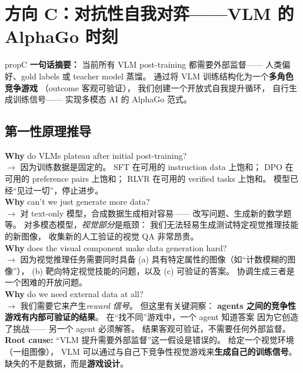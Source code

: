 \documentclass[12pt,a4paper]{article}
\begin{document}
\newpage
\section{方向 C：对抗性自我对弈——VLM 的 AlphaGo 时刻}
\label{sec:propC}

\begin{proposalbox}{propC}
\textbf{一句话摘要：}
当前所有 VLM post-training 都需要外部监督——
人类偏好、gold labels 或 teacher model 蒸馏。
通过将 VLM 训练结构化为一个\textbf{多角色竞争游戏}
（outcome 客观可验证），
我们创建一个开放式自我提升循环，
自行生成训练信号——
实现多模态 AI 的 AlphaGo 范式。
\end{proposalbox}

\subsection{第一性原理推导}

\begin{whybox}
\textbf{Why} do VLMs plateau after initial post-training?\\
$\rightarrow$ 因为训练数据是固定的。
SFT 在可用的 instruction data 上饱和；
DPO 在可用的 preference pairs 上饱和；
RLVR 在可用的 verified tasks 上饱和。
模型已经``见过一切''，停止进步。\\[3pt]
\textbf{Why} can't we just generate more data?\\
$\rightarrow$ 对 text-only 模型，合成数据生成相对容易——
改写问题、生成新的数学题等。
对多模态模型，\textit{视觉部分}是瓶颈：
我们无法轻易生成测试特定视觉推理技能的新图像，
收集新的人工验证的视觉 QA 非常昂贵。\\[3pt]
\textbf{Why} does the visual component make data generation hard?\\
$\rightarrow$ 因为视觉推理任务需要同时具备
(a) 具有特定属性的图像（如``计数模糊的图像''），
(b) 靶向特定视觉技能的问题，以及
(c) 可验证的答案。
协调生成三者是一个困难的开放问题。\\[3pt]
\textbf{Why} do we need external data at all?\\
$\rightarrow$ 我们需要它来产生\textit{reward 信号}。
但这里有关键洞察：
\textbf{agents 之间的竞争性游戏有内部可验证的结果}。
在``找不同''游戏中，一个 agent 知道答案
因为它创造了挑战——
另一个 agent 必须解答。
结果客观可验证，不需要任何外部监督。\\[3pt]
\textbf{Root cause:}
``VLM 提升需要外部监督''这一假设是错误的。
给定一个视觉环境（一组图像），
VLM 可以通过与自己下竞争性视觉游戏来\textbf{生成自己的训练信号}。
缺失的不是数据，而是\textbf{游戏设计}。
\end{whybox}
\end{document}

